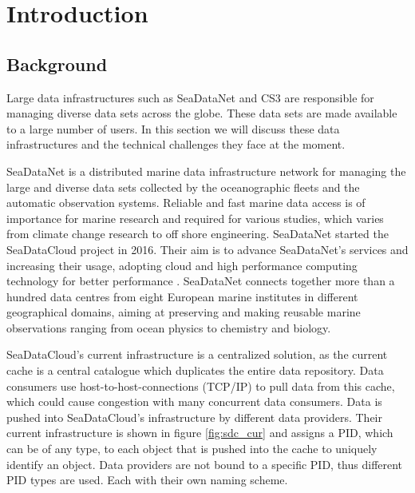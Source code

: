 \section{Introduction}

\subsection{Background}
\label{introduction-background}

Large data infrastructures such as SeaDataNet and CS3 are responsible for managing diverse data sets across the globe. These data sets are made available to a large number of users. In this section we will discuss these data infrastructures and the technical challenges they face at the moment.

SeaDataNet is a distributed marine data infrastructure network for managing the large and diverse data sets collected by the oceanographic fleets and the automatic observation systems. Reliable and fast marine data access is of importance for marine research and required for various studies, which varies from climate change research to off shore engineering. SeaDataNet started the SeaDataCloud project in 2016. Their aim is to advance SeaDataNet's services and increasing their usage, adopting cloud and high performance computing technology for better performance \cite{sdc}. SeaDataNet connects together more than a hundred data centres from eight European marine institutes in different geographical domains, aiming at preserving and making reusable marine observations ranging from ocean physics to chemistry and biology.

SeaDataCloud's current infrastructure is a centralized solution, as the current cache is a central catalogue which duplicates the entire data repository. Data consumers use host-to-host-connections (TCP/IP) to pull data from this cache, which could cause congestion with many concurrent data consumers. Data is pushed into SeaDataCloud's infrastructure by different data providers. Their current infrastructure is shown in figure \ref{fig:sdc_cur} and assigns a PID, which can be of any type, to each object that is pushed into the cache to uniquely identify an object. Data providers are not bound to a specific PID, thus different PID types are used. Each with their own naming scheme.


